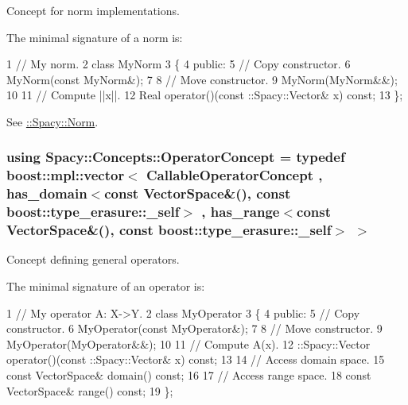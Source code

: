 Concept for norm implementations. 

\label{group__ConceptGroup_ga8b6032c46f6e31840a2c956c6360549b_NormConceptAnchor}%
\hypertarget{group__ConceptGroup_ga8b6032c46f6e31840a2c956c6360549b_NormConceptAnchor}{}%
The minimal signature of a norm is\+: 
\begin{DoxyCode}
1 // My norm.
2 class MyNorm
3 \{
4 public:
5   // Copy constructor.
6   MyNorm(const MyNorm&);
7 
8   // Move constructor.
9   MyNorm(MyNorm&&);
10 
11   // Compute ||x||.
12   Real operator()(const ::Spacy::Vector& x) const;
13 \};
\end{DoxyCode}


See \hyperlink{group__SpacyGroup_gaf4f33b11d657c48566d961a013c92bd1_NormAnchor}{\+:\+:Spacy\+:\+:Norm}. \hypertarget{group__ConceptGroup_ga7d984281b647a6d8e4c0a7ea5faeb90e_ga7d984281b647a6d8e4c0a7ea5faeb90e}{}
\subsubsection[{Operator\+Concept}]{\setlength{\rightskip}{0pt plus 5cm}using {\bf Spacy\+::\+Concepts\+::\+Operator\+Concept} = typedef boost\+::mpl\+::vector$<$ {\bf Callable\+Operator\+Concept} , has\+\_\+domain$<$const {\bf Vector\+Space}\&(), const boost\+::type\+\_\+erasure\+::\+\_\+self$>$ , has\+\_\+range$<$const {\bf Vector\+Space}\&(), const boost\+::type\+\_\+erasure\+::\+\_\+self$>$ $>$}\label{group__ConceptGroup_ga7d984281b647a6d8e4c0a7ea5faeb90e_ga7d984281b647a6d8e4c0a7ea5faeb90e}


Concept defining general operators. 

\label{group__ConceptGroup_ga7d984281b647a6d8e4c0a7ea5faeb90e_OperatorConceptAnchor}%
\hypertarget{group__ConceptGroup_ga7d984281b647a6d8e4c0a7ea5faeb90e_OperatorConceptAnchor}{}%
The minimal signature of an operator is\+: 
\begin{DoxyCode}
1 // My operator A: X->Y.
2 class MyOperator
3 \{
4 public:
5   // Copy constructor.
6   MyOperator(const MyOperator&);
7 
8   // Move constructor.
9   MyOperator(MyOperator&&);
10 
11   // Compute A(x).
12   ::Spacy::Vector operator()(const ::Spacy::Vector& x) const;
13 
14   // Access domain space.
15   const VectorSpace& domain() const;
16 
17   // Access range space.
18   const VectorSpace& range() const;
19 \};
\end{DoxyCode}


